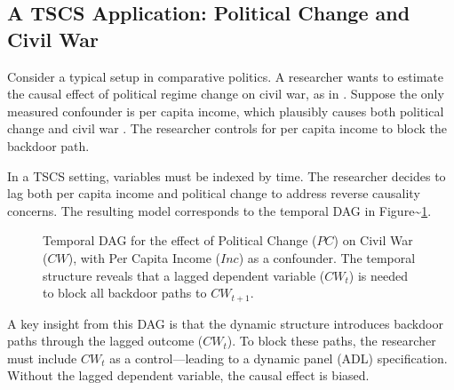 \documentclass[
]{article}
\begin{document}
\subsection{A TSCS Application: Political Change and Civil
War}\label{a-tscs-application-political-change-and-civil-war}

Consider a typical setup in comparative politics. A researcher wants to
estimate the causal effect of political regime change on civil war, as
in \citet{hegre2001toward}. Suppose the only measured confounder is per
capita income, which plausibly causes both political change and civil
war \citep{blattman2010civil}. The researcher controls for per capita
income to block the backdoor path.

In a TSCS setting, variables must be indexed by time. The researcher
decides to lag both per capita income and political change to address
reverse causality concerns. The resulting model corresponds to the
temporal DAG in Figure\textasciitilde{}\ref{fig:dag_tscs}.

\begin{figure}[H]
\centering
{}
\caption{Temporal DAG for the effect of Political Change ($PC$) on Civil War ($CW$), with Per Capita Income ($Inc$) as a confounder. The temporal structure reveals that a lagged dependent variable ($CW_t$) is needed to block all backdoor paths to $CW_{t+1}$.}
\label{fig:dag_tscs}
\end{figure}

A key insight from this DAG is that the dynamic structure introduces
backdoor paths through the lagged outcome (\(CW_t\)). To block these
paths, the researcher must include \(CW_t\) as a control---leading to a
dynamic panel (ADL) specification. Without the lagged dependent
variable, the causal effect is biased.
\end{document}
